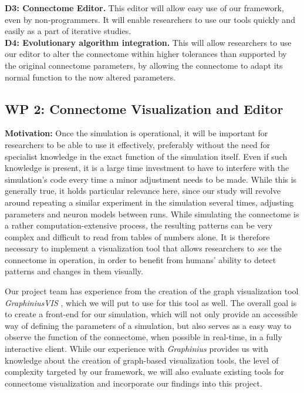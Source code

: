 \documentclass[a4paper,11pt]{article}
\begin{document}
\textbf{D3: Connectome Editor.} This editor will allow easy use of our framework, even by non-programmers. It will enable researchers to use our tools quickly and easily as a part of iterative studies. 
\\[0,2cm]

\textbf{D4: Evolutionary algorithm integration.} This will allow researchers to use our editor to alter the connectome within higher tolerances than supported by the original connectome parameters, by allowing the connectome to adapt its normal function to the now altered parameters. 
\\[0,2cm]

\subsection{WP 2: Connectome Visualization and Editor}

\textbf{Motivation:}
Once the simulation is operational, it will be important for researchers to be able to use it effectively, preferably without the need for specialist knowledge in the exact function of the simulation itself. Even if such knowledge is present, it is a large time investment to have to interfere with the simulation's code every time a minor adjustment needs to be made. While this is generally true, it holds particular relevance here, since our study will revolve around repeating a similar experiment in the simulation several times, adjusting parameters and neuron models between runs.
While simulating the connectome is a rather computation-extensive process, the resulting patterns can be very complex and difficult to read from tables of numbers alone. It is therefore necessary to implement a visualization tool that allows researchers to \emph{see} the connectome in operation, in order to benefit from humans' ability to detect patterns and changes in them visually.

Our project team has experience from the creation of the graph visualization tool \emph{GraphiniusVIS} , which we will put to use for this tool as well. The overall goal is to create a front-end for our simulation, which will not only provide an accessible way of defining the parameters of a simulation, but also serves as a easy way to observe the function of the connectome, when possible in real-time, in a fully interactive client. While our experience with \emph{Graphinius} provides us with knowledge about the creation of graph-based visualization tools, the level of complexity targeted by our framework, we will also evaluate existing tools for connectome visualization and incorporate our findings into this project.
\\[0,2cm]
\end{document}
